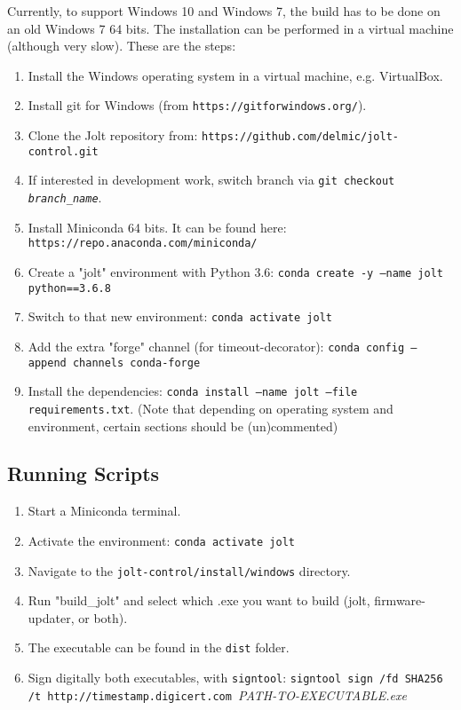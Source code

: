 \documentclass[]{article}
\begin{document}
Currently, to support Windows 10 and Windows 7, the build has to be done on an old Windows 7 64 bits.
The installation can be performed in a virtual machine (although very slow).
These are the steps:
\begin{enumerate}
	\item Install the Windows operating system in a virtual machine, e.g. VirtualBox.
	\item Install git for Windows (from \texttt{https://gitforwindows.org/}).
	\item Clone the Jolt repository from: \texttt{https://github.com/delmic/jolt-control.git}
	\item If interested in development work, switch branch via \texttt{git checkout \textit{branch\_name}}.
	\item Install Miniconda 64 bits. It can be found here: \texttt{https://repo.anaconda.com/miniconda/}
	\item Create a "jolt" environment with Python 3.6: \texttt{conda create -y --name jolt python==3.6.8}
	\item Switch to that new environment: \texttt{conda activate jolt}
	\item Add the extra "forge" channel (for timeout-decorator): \texttt{conda config --append channels conda-forge}
	\item Install the dependencies: \texttt{conda install --name jolt --file requirements.txt}. (Note that depending on operating system and environment, certain sections should be (un)commented)
\end{enumerate}

\subsection{Running Scripts}
\begin{enumerate}
	\item Start a Miniconda terminal.
	\item Activate the environment: \texttt{conda activate jolt}
	\item Navigate to the \texttt{jolt-control/install/windows} directory.
	\item Run "build\_jolt" and select which .exe you want to build (jolt, firmware-updater, or both).
	\item The executable can be found in the \texttt{dist} folder.
	\item Sign digitally both executables, with \texttt{signtool}: \texttt{signtool sign /fd SHA256 /t http://timestamp.digicert.com }\emph{PATH-TO-EXECUTABLE.exe}
\end{enumerate}
\end{document}
